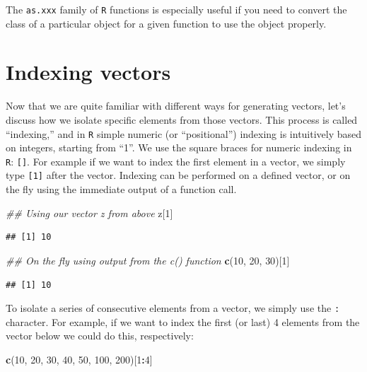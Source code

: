 \documentclass[]{book}
\newenvironment{Shaded}{\begin{snugshade}}{\end{snugshade}}
\newcommand{\CommentTok}[1]{\textcolor[rgb]{0.56,0.35,0.01}{\textit{#1}}}
\newcommand{\DecValTok}[1]{\textcolor[rgb]{0.00,0.00,0.81}{#1}}
\newcommand{\KeywordTok}[1]{\textcolor[rgb]{0.13,0.29,0.53}{\textbf{#1}}}
\newcommand{\NormalTok}[1]{#1}
\newcommand{\OperatorTok}[1]{\textcolor[rgb]{0.81,0.36,0.00}{\textbf{#1}}}
\begin{document}
The \texttt{as.xxx} family of \texttt{R} functions is especially useful if you need to convert the class of a particular object for a given function to use the object properly.

\hypertarget{indexing-vectors}{%
\section{Indexing vectors}\label{indexing-vectors}}

Now that we are quite familiar with different ways for generating vectors, let's discuss how we isolate specific elements from those vectors. This process is called ``indexing,'' and in \texttt{R} simple numeric (or ``positional'') indexing is intuitively based on integers, starting from ``1''. We use the square braces for numeric indexing in \texttt{R}: \texttt{{[}{]}}. For example if we want to index the first element in a vector, we simply type \texttt{{[}1{]}} after the vector. Indexing can be performed on a defined vector, or on the fly using the immediate output of a function call.

\begin{Shaded}
\begin{Highlighting}[]
\CommentTok{## Using our vector z from above}
\NormalTok{z[}\DecValTok{1}\NormalTok{]}
\end{Highlighting}
\end{Shaded}

\begin{verbatim}
## [1] 10
\end{verbatim}

\begin{Shaded}
\begin{Highlighting}[]
\CommentTok{## On the fly using output from the c() function}
\KeywordTok{c}\NormalTok{(}\DecValTok{10}\NormalTok{, }\DecValTok{20}\NormalTok{, }\DecValTok{30}\NormalTok{)[}\DecValTok{1}\NormalTok{]}
\end{Highlighting}
\end{Shaded}

\begin{verbatim}
## [1] 10
\end{verbatim}

To isolate a series of consecutive elements from a vector, we simply use the \texttt{:} character. For example, if we want to index the first (or last) 4 elements from the vector below we could do this, respectively:

\begin{Shaded}
\begin{Highlighting}[]
\KeywordTok{c}\NormalTok{(}\DecValTok{10}\NormalTok{, }\DecValTok{20}\NormalTok{, }\DecValTok{30}\NormalTok{, }\DecValTok{40}\NormalTok{, }\DecValTok{50}\NormalTok{, }\DecValTok{100}\NormalTok{, }\DecValTok{200}\NormalTok{)[}\DecValTok{1}\OperatorTok{:}\DecValTok{4}\NormalTok{]}
\end{Highlighting}
\end{Shaded}
\end{document}
